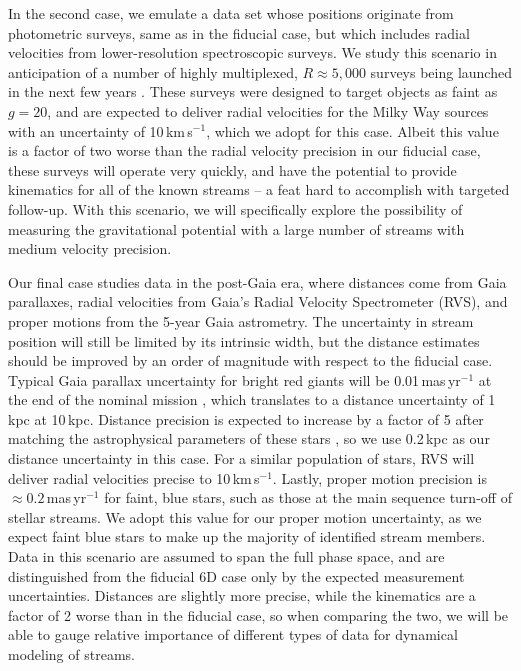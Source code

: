 \documentclass[modern]{aastex62}
\begin{document}
In the second case, we emulate a data set whose positions originate from photometric surveys, same as in the fiducial case, but which includes radial velocities from lower-resolution spectroscopic surveys.
We study this scenario in anticipation of a number of highly multiplexed, $R\approx5,000$ surveys being launched in the next few years \citep[e.g., DESI,][]{desi}.
These surveys were designed to target objects as faint as $g=20$, and are expected to deliver radial velocities for the Milky Way sources with an uncertainty of 10\,km\,s$^{-1}$, which we adopt for this case.
Albeit this value is a factor of two worse than the radial velocity precision in our fiducial case, these surveys will operate very quickly, and have the potential to provide kinematics for all of the known streams -- a feat hard to accomplish with targeted follow-up.
With this scenario, we will specifically explore the possibility of measuring the gravitational potential with a large number of streams with medium velocity precision.

Our final case studies data in the post-Gaia era, where distances come from Gaia parallaxes, radial velocities from Gaia's Radial Velocity Spectrometer (RVS), and proper motions from the 5-year Gaia astrometry.
The uncertainty in stream position will still be limited by its intrinsic width, but the distance estimates should be improved by an order of magnitude with respect to the fiducial case.
Typical Gaia parallax uncertainty for bright red giants will be 0.01\,mas\,yr$^{-1}$ at the end of the nominal mission \citep{perryman2001, prusti2016}, which translates to a distance uncertainty of 1\,kpc at 10\,kpc.
Distance precision is expected to increase by a factor of 5 after matching the astrophysical parameters of these stars \citep{mcmillan2017, ting2018}, so we use 0.2\,kpc as our distance uncertainty in this case.
For a similar population of stars, RVS will deliver radial velocities precise to 10\,km\,s$^{-1}$.
Lastly, proper motion precision is $\approx0.2$\,mas\,yr$^{-1}$ for faint, blue stars, such as those at the main sequence turn-off of stellar streams.
We adopt this value for our proper motion uncertainty, as we expect faint blue stars to make up the majority of identified stream members.
Data in this scenario are assumed to span the full phase space, and are distinguished from the fiducial 6D case only by the expected measurement uncertainties.
Distances are slightly more precise, while the kinematics are a factor of 2 worse than in the fiducial case, so when comparing the two, we will be able to gauge relative importance of different types of data for dynamical modeling of streams.
\end{document}
